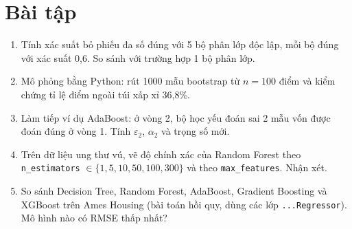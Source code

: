 \section{Bài tập}
\begin{enumerate}
    \item Tính xác suất bỏ phiếu đa số đúng với 5 bộ phân lớp độc lập, mỗi bộ đúng với xác suất 0,6. So sánh với trường hợp 1 bộ phân lớp.
    \item Mô phỏng bằng Python: rút 1000 mẫu bootstrap từ $n = 100$ điểm và kiểm chứng tỉ lệ điểm ngoài túi xấp xỉ 36,8\%.
    \item Làm tiếp ví dụ AdaBoost: ở vòng 2, bộ học yếu đoán sai 2 mẫu vốn được đoán đúng ở vòng 1. Tính $\varepsilon_2$, $\alpha_2$ và trọng số mới.
    \item Trên dữ liệu ung thư vú, vẽ độ chính xác của Random Forest theo \texttt{n\_estimators} $\in \{1, 5, 10, 50, 100, 300\}$ và theo \texttt{max\_features}. Nhận xét.
    \item So sánh Decision Tree, Random Forest, AdaBoost, Gradient Boosting và XGBoost trên Ames Housing (bài toán hồi quy, dùng các lớp \texttt{...Regressor}). Mô hình nào có RMSE thấp nhất?
\end{enumerate}

